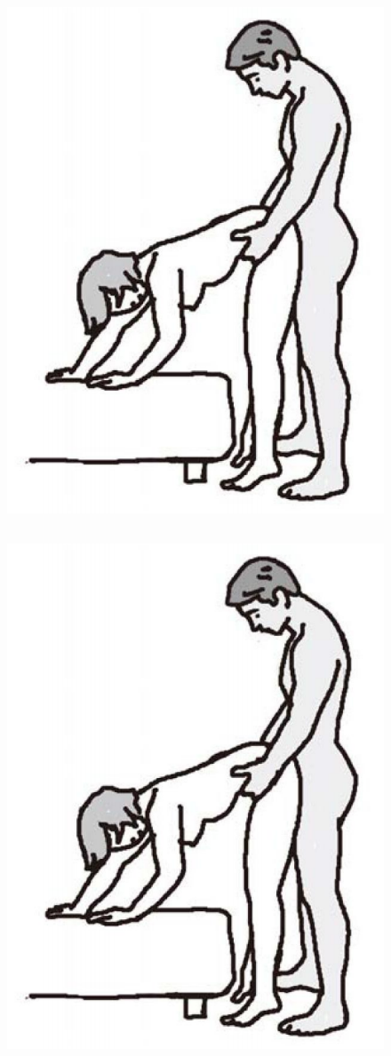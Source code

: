 \documentclass[12pt,UTF8]{ctexbook}
\begin{document}
\subsection{}

\begin{figure}[htbp]
	\centering
	\includegraphics[width=0.7\linewidth]{tw12}
	\caption{}
	\label{fig:1}
\end{figure}

\subsection{}

\begin{figure}[htbp]
	\centering
	\includegraphics[width=0.7\linewidth]{tw12}
	\caption{}
	\label{fig:1}
\end{figure}
\end{document}
